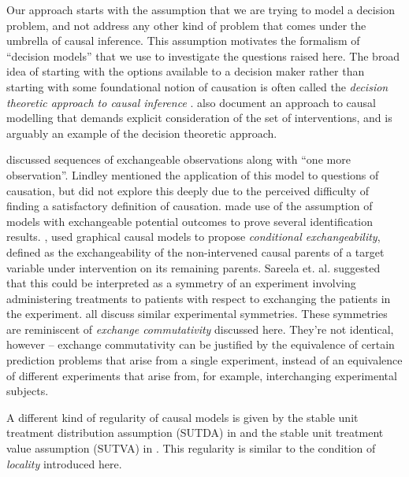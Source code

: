 \documentclass{article}
\begin{document}
Our approach starts with the assumption that we are trying to model a decision problem, and not address any other kind of problem that comes under the umbrella of causal inference. This assumption motivates the formalism of ``decision models'' that we use to investigate the questions raised here. The broad idea of starting with the options available to a decision maker rather than starting with some foundational notion of causation is often called the \emph{decision theoretic approach to causal inference} \citep{heckerman_decision-theoretic_1995,dawid_decision-theoretic_2012,dawid_decision-theoretic_2020}. \citet{lattimore_causal_2019,lattimore_replacing_2019} also document an approach to causal modelling that demands explicit consideration of the set of interventions, and is arguably an example of the decision theoretic approach.

\citet{lindley_role_1981} discussed sequences of exchangeable observations along with ``one more observation''. Lindley mentioned the application of this model to questions of causation, but did not explore this deeply due to the perceived difficulty of finding a satisfactory definition of causation. \citet{rubin_causal_2005, imbens_causal_2015} made use of the assumption of models with exchangeable potential outcomes to prove several identification results. \citet{saarela_role_2020}, used graphical causal models to propose \emph{conditional exchangeability}, defined as the exchangeability of the non-intervened causal parents of a target variable under intervention on its remaining parents. Sareela et. al. suggested that this could be interpreted as a symmetry of an experiment involving administering treatments to patients with respect to exchanging the patients in the experiment. \citet{hernan_estimating_2006,hernan_beyond_2012,greenland_identifiability_1986,banerjee_chapter_2017,dawid_decision-theoretic_2020} all discuss similar experimental symmetries. These symmetries are reminiscent of \emph{exchange commutativity} discussed here. They're not identical, however -- exchange commutativity can be justified by the equivalence of certain prediction problems that arise from a single experiment, instead of an equivalence of different experiments that arise from, for example, interchanging experimental subjects.

A different kind of regularity of causal models is given by the stable unit treatment distribution assumption (SUTDA) in \citet{dawid_decision-theoretic_2020} and the stable unit treatment value assumption (SUTVA) in \citep{rubin_causal_2005}. This regularity is similar to the condition of \emph{locality} introduced here.
\end{document}
